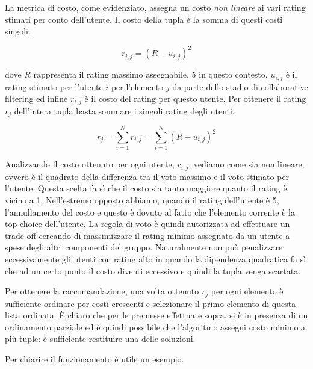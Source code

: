 \documentclass[letterpaper]{article}
\begin{document}
La metrica di costo, come evidenziato, assegna un costo \emph{non lineare} ai vari rating stimati per conto dell'utente. Il costo della tupla è la somma di questi costi singoli.

\begin{equation}
    r_{i,j} = (R - u_{i,j})^2
\end{equation}

dove $R$ rappresenta il rating massimo assegnabile, 5 in questo contesto, $u_{i,j}$ è il rating stimato per l'utente $i$ per l'elemento $j$ da parte dello stadio di collaborative filtering ed infine $r_{i,j}$ è il costo del rating per questo utente. Per ottenere il rating $r_{j}$ dell'intera tupla basta sommare i singoli rating degli utenti.

\begin{equation}
    r_j = \sum_{i=1}^{N} r_{i,j} = \sum_{i=1}^{N} (R - u_{i,j})^2
\end{equation}

Analizzando il costo ottenuto per ogni utente, $r_{i,j}$, vediamo come sia non lineare, ovvero è il quadrato della differenza tra il voto massimo e il voto stimato per l'utente. Questa scelta fa sì che il costo sia tanto maggiore quanto il rating è vicino a 1. Nell'estremo opposto abbiamo, quando il rating dell'utente è 5, l'annullamento del costo e questo è dovuto al fatto che l'elemento corrente è la top choice dell'utente. La regola di voto è quindi autorizzata ad effettuare un trade off cercando di massimizzare il rating minimo assegnato da un utente a spese degli altri componenti del gruppo. Naturalmente non può penalizzare eccessivamente gli utenti con rating alto in quando la dipendenza quadratica fa sì che ad un certo punto il costo diventi eccessivo e quindi la tupla venga scartata.

Per ottenere la raccomandazione, una volta ottenuto $r_{j}$ per ogni elemento è sufficiente ordinare per costi crescenti e selezionare il primo elemento di questa lista ordinata. \`E chiaro che per le premesse effettuate sopra, si è in presenza di un ordinamento parziale ed è quindi possibile che l'algoritmo assegni costo minimo a più tuple: è sufficiente restituire una delle soluzioni.

Per chiarire il funzionamento è utile un esempio.
\end{document}
